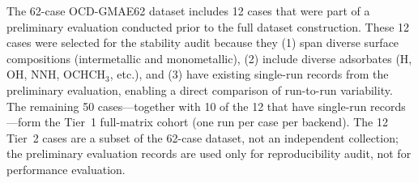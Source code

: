 The 62-case OCD-GMAE62 dataset includes 12 cases that were part of a preliminary evaluation conducted prior to the full dataset construction.
These 12 cases were selected for the stability audit because they (1) span diverse surface compositions (intermetallic and monometallic),
(2) include diverse adsorbates (H, OH, NNH, OCHCH$_3$, etc.), and (3) have existing single-run records from the preliminary evaluation,
enabling a direct comparison of run-to-run variability.
The remaining 50 cases---together with 10 of the 12 that have single-run records---form the Tier~1 full-matrix cohort (one run per case per backend).
The 12 Tier~2 cases are a subset of the 62-case dataset, not an independent collection; the preliminary evaluation records are used only for reproducibility audit, not for performance evaluation.
